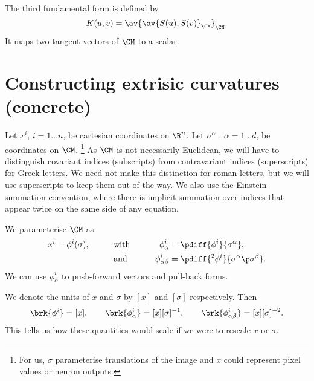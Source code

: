 \documentclass[12pt]{article}
\newcommand{\inv}{^{-1}}
\newcommand{\invsq}{^{-2}}
\begin{document}
The third fundamental form is defined by \cite{Eschenburg2010228}
%
\begin{equation}\label{eq:third fund}
  K(u,v) =  \av{ \av{S(u),S(v)}_\CM }_{\CN}.
\end{equation}
%
It maps two tangent vectors of $\CM$ to a scalar.


\section{Constructing extrisic curvatures (concrete)}\label{sec:scalarcurv}

Let $x^i$, $i=1 \ldots n$, be cartesian coordinates on $\R^n$.
Let $\sigma^\alpha$ , $\alpha=1 \dots d$, be coordinates on $\CM$.%
\footnote{For us, $\sigma$ parameterise translations of the image and $x$ could represent pixel values or neuron outputs.}
As $\CM$ is not necessarily Euclidean, we will have to distinguish covariant indices (subscripts) from contravariant indices (superscripts) for Greek letters.
We need not make this distinction for roman letters, but we will use superscripts to keep them out of the way.
We also use the Einstein summation convention, where there is implicit summation over indices that appear twice on the same side of any equation.

We parameterise $\CM$ as
%
\begin{equation}\label{eq:embedding}
  \begin{aligned}
  x^i &= \phi^i(\sigma), &
    \qquad &\text{with} \qquad &
      \phi^i_\alpha &= \pdiff{\phi^i}{\sigma^\alpha}, \\
    &&&\text{and}&
      \phi^i_{\alpha\beta} &=  \pdiff{{}^2\phi^i}{\sigma^\alpha\p\sigma^\beta}.
  \end{aligned}
\end{equation}
%
We can use $\phi^i_\alpha$ to push-forward vectors and pull-back forms.

We denote the units of $x$ and $\sigma$ by $[x]$ and $[\sigma]$ respectively.
Then
%
\begin{equation}\label{eq:phiunits}
  \brk{\phi^i} = [x],
  \qquad
  \brk{\phi^i_\alpha} = [x][\sigma]\inv,
  \qquad
  \brk{\phi^i_{\alpha\beta}} = [x][\sigma]\invsq.
\end{equation}
%
This tells us how these quantities would scale if we were to rescale $x$ or $\sigma$.
\end{document}

